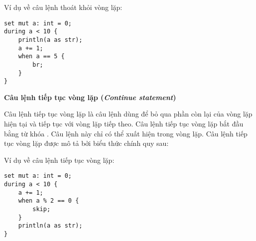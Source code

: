 \regexbreakstmt

\noindent Ví dụ về câu lệnh thoát khỏi vòng lặp:
\begin{lstlisting}[]
set mut a: int = 0;
during a < 10 {
    println(a as str);
    a += 1;
    when a == 5 {
        br;
    }
}
\end{lstlisting}

\noindent\textbf{\label{ch2:continue_stmt}Câu lệnh tiếp tục vòng lặp (\textit{Continue statement})}

    Câu lệnh tiếp tục vòng lặp là câu lệnh dùng để bỏ qua phần còn lại của vòng lặp hiện tại và tiếp tục với vòng lặp tiếp theo. Câu lệnh tiếp tục vòng lặp bắt đầu bằng từ khóa . Câu lệnh này chỉ có thể xuất hiện trong vòng lặp. Câu lệnh tiếp tục vòng lặp được mô tả bởi biểu thức chính quy sau:

\regexcontinuestmt

\noindent Ví dụ về câu lệnh tiếp tục vòng lặp:
\begin{lstlisting}[]
set mut a: int = 0;
during a < 10 {
    a += 1;
    when a % 2 == 0 {
        skip;
    }
    println(a as str);
}
\end{lstlisting}
